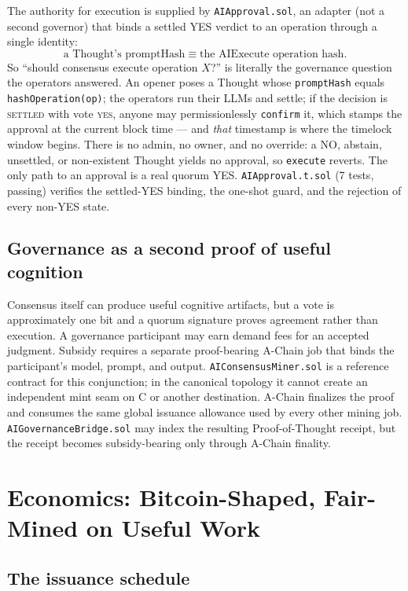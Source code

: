 \documentclass[11pt,a4paper]{article}
\begin{document}
The authority for execution is supplied by \texttt{AIApproval.sol}, an adapter (not a second governor) that binds a settled YES verdict to an operation through a single identity:
\[
  \text{a Thought's promptHash} \;\equiv\; \text{the AIExecute operation hash.}
\]
So ``should consensus execute operation $X$?'' is literally the governance question the operators answered. An opener poses a Thought whose \texttt{promptHash} equals \texttt{hashOperation(op)}; the operators run their LLMs and settle; if the decision is \textsc{settled} with vote \textsc{yes}, anyone may permissionlessly \texttt{confirm} it, which stamps the approval at the current block time --- and \emph{that} timestamp is where the timelock window begins. There is no admin, no owner, and no override: a NO, abstain, unsettled, or non-existent Thought yields no approval, so \texttt{execute} reverts. The only path to an approval is a real quorum YES. \texttt{AIApproval.t.sol} (7 tests, passing) verifies the settled-YES binding, the one-shot guard, and the rejection of every non-YES state.

\subsection{Governance as a second proof of useful cognition}\label{sec:govmint}

Consensus itself can produce useful cognitive artifacts, but a vote is approximately one bit and a quorum signature proves agreement rather than execution. A governance participant may earn demand fees for an accepted judgment. Subsidy requires a separate proof-bearing A-Chain job that binds the participant's model, prompt, and output. \texttt{AIConsensusMiner.sol} is a reference contract for this conjunction; in the canonical topology it cannot create an independent mint seam on C or another destination. A-Chain finalizes the proof and consumes the same global issuance allowance used by every other mining job. \texttt{AIGovernanceBridge.sol} may index the resulting Proof-of-Thought receipt, but the receipt becomes subsidy-bearing only through A-Chain finality.

\section{Economics: Bitcoin-Shaped, Fair-Mined on Useful Work}\label{sec:economics}

\subsection{The issuance schedule}
\end{document}
